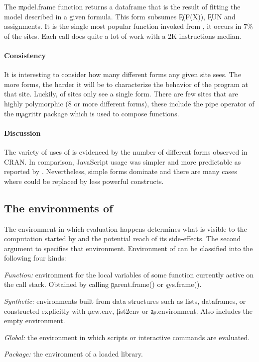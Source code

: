 \documentclass[review,screen,acmsmall,anonymous=true]{acmart}
\begin{document}
\medskip\noindent{} The \c{model.frame} function
returns a dataframe that is the result of fitting the model described in a given
formula. This form subsumes \c{F(F(X))}, \c{FUN} and assignments. It is the
single most popular function invoked from \eval, it occurs in 7\% of the sites.
Each call does quite a lot of work with a 2K instructions median.

\paragraph{Consistency} It is interesting to consider how many different
forms any given site sees. The more forms, the harder it will be to characterize
the behavior of the program at that site. Luckily, \packageNbOneMinimizedPercent
of sites only see a single form. There are few sites that are highly polymorphic
(8 or more different forms), these include the pipe operator of the \c{magrittr}
package which is used to compose functions.

\paragraph{Discussion} The variety of uses of \eval is evidenced by the number
of different forms observed in CRAN. In comparison, JavaScript \eval usage was
simpler and more predictable as reported by \citet{oopsla12b}. Nevertheless,
simple forms dominate and there are many cases where \eval could be replaced
by less powerful constructs.


\subsection{The environments of \eval}\label{sec:env}

The environment in which evaluation happens determines what is visible to the
computation started by \eval and the potential reach of its side-effects. The
second argument to \eval specifies that environment. Environment of \eval can be
classified into the following four kinds:

\begin{compactitem}[---]
\item \emph{Function:} environment for the local variables of some function
  currently active on the call stack. Obtained by calling \c{parent.frame()} or
  \c{sys.frame()}.
\item \emph{Synthetic:} environments built from data structures such as lists,
  dataframes, or constructed explicitly with \c{new.env}, \c{list2env} or
  \c{as.environment}. Also includes the empty environment.
\item \emph{Global:} the environment in which scripts or interactive commands
  are evaluated.
\item \emph{Package:} the environment of a loaded library.
\end{compactitem}
\end{document}
